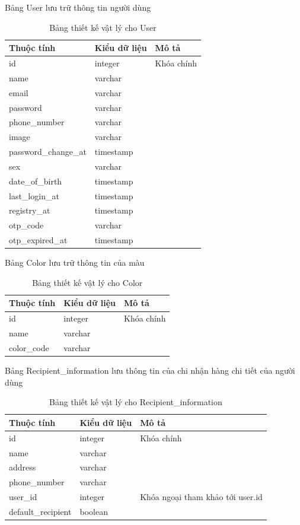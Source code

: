 \newpage
\noindent Bảng User lưu trữ thông tin người dùng
\begin{table}[H]
\centering
\begin{tabular}{|p{4cm}|p{3cm}|p{7cm}|}
\hline
Thuộc tính & Kiểu dữ liệu & Mô tả \\
\hline
id & integer & Khóa chính \\
\hline
name & varchar &  \\
\hline
email & varchar &  \\
\hline
password & varchar &  \\
\hline
phone\_number & varchar &  \\
\hline
image & varchar &  \\
\hline
password\_change\_at & timestamp &  \\
\hline
sex & varchar &  \\
\hline
date\_of\_birth & timestamp &  \\
\hline
last\_login\_at & timestamp &  \\
\hline
registry\_at & timestamp &  \\
\hline
otp\_code & varchar &  \\
\hline
otp\_expired\_at & timestamp &  \\
\hline

\end{tabular}
\caption{Bảng thiết kế vật lý cho User}
\end{table}

\noindent Bảng Color lưu trữ thông tin của màu
\begin{table}[H]
\centering
\begin{tabular}{|p{4cm}|p{3cm}|p{7cm}|}
\hline
Thuộc tính & Kiểu dữ liệu & Mô tả \\
\hline
id & integer & Khóa chính \\
\hline
name & varchar & \\
\hline
color\_code & varchar &  \\
\hline

\end{tabular}
\caption{Bảng thiết kế vật lý cho Color}
\end{table}

\newpage
\noindent Bảng Recipient\_information lưu thông tin của chi nhận hàng chi tiết của người dùng
\begin{table}[H]
\centering
\begin{tabular}{|p{4cm}|p{3cm}|p{7cm}|}
\hline
Thuộc tính & Kiểu dữ liệu & Mô tả \\
\hline
id & integer & Khóa chính \\
\hline
name & varchar &  \\
\hline
address & varchar &  \\
\hline
phone\_number & varchar &  \\
\hline
user\_id & integer &  Khóa ngoại tham khảo tới user.id\\
\hline
default\_recipient & boolean &  \\
\hline

\end{tabular}
\caption{Bảng thiết kế vật lý cho Recipient\_information}
\end{table}

